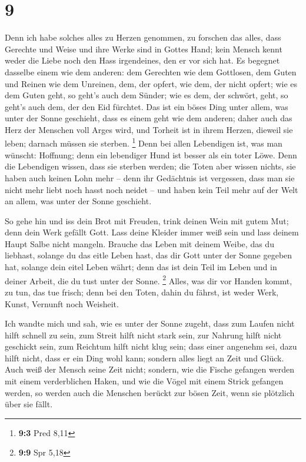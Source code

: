 \hypertarget{section-3}{%
\section{9}\label{section-3}}

 Denn ich habe solches alles zu Herzen genommen, zu
forschen das alles, dass Gerechte und Weise und ihre Werke sind in
Gottes Hand; kein Mensch kennt weder die Liebe noch den Hass
irgendeines, den er vor sich hat.  Es begegnet dasselbe
einem wie dem anderen: dem Gerechten wie dem Gottlosen, dem Guten und
Reinen wie dem Unreinen, dem, der opfert, wie dem, der nicht opfert; wie
es dem Guten geht, so geht's auch dem Sünder; wie es dem, der schwört,
geht, so geht's auch dem, der den Eid fürchtet.  Das ist
ein böses Ding unter allem, was unter der Sonne geschieht, dass es einem
geht wie dem anderen; daher auch das Herz der Menschen voll Arges wird,
und Torheit ist in ihrem Herzen, dieweil sie leben; darnach müssen sie
sterben. \footnote{\textbf{9:3} Pred 8,11}  Denn bei allen
Lebendigen ist, was man wünscht: Hoffnung; denn ein lebendiger Hund ist
besser als ein toter Löwe.  Denn die Lebendigen wissen,
dass sie sterben werden; die Toten aber wissen nichts, sie haben auch
keinen Lohn mehr -- denn ihr Gedächtnis ist vergessen, 
dass man sie nicht mehr liebt noch hasst noch neidet -- und haben kein
Teil mehr auf der Welt an allem, was unter der Sonne geschieht.

 So gehe hin und iss dein Brot mit Freuden, trink deinen
Wein mit gutem Mut; denn dein Werk gefällt Gott.  Lass
deine Kleider immer weiß sein und lass deinem Haupt Salbe nicht mangeln.
 Brauche das Leben mit deinem Weibe, das du liebhast,
solange du das eitle Leben hast, das dir Gott unter der Sonne gegeben
hat, solange dein eitel Leben währt; denn das ist dein Teil im Leben und
in deiner Arbeit, die du tust unter der Sonne. \footnote{\textbf{9:9}
  Spr 5,18}  Alles, was dir vor Handen kommt, zu tun, das
tue frisch; denn bei den Toten, dahin du fährst, ist weder Werk, Kunst,
Vernunft noch Weisheit.

 Ich wandte mich und sah, wie es unter der Sonne zugeht,
dass zum Laufen nicht hilft schnell zu sein, zum Streit hilft nicht
stark sein, zur Nahrung hilft nicht geschickt sein, zum Reichtum hilft
nicht klug sein; dass einer angenehm sei, dazu hilft nicht, dass er ein
Ding wohl kann; sondern alles liegt an Zeit und Glück. 
Auch weiß der Mensch seine Zeit nicht; sondern, wie die Fische gefangen
werden mit einem verderblichen Haken, und wie die Vögel mit einem Strick
gefangen werden, so werden auch die Menschen berückt zur bösen Zeit,
wenn sie plötzlich über sie fällt.


